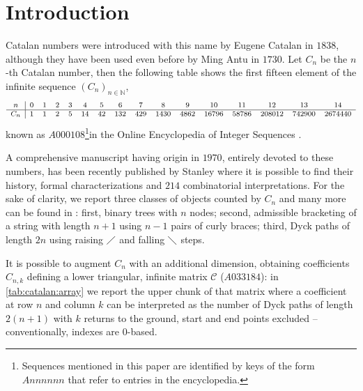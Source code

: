 
\section{Introduction}

\noindent Catalan numbers were introduced with this name by
Eugene Catalan in $1838$, although they have been used even before by Ming Antu
in $1730$. Let $C_{n}$ be the $n$-th Catalan number, then the following
table shows the first fifteen element of the infinite sequence
$\left(C_{n}\right)_{n\in\mathbb{N}}$,
\begin{displaymath}
    \footnotesize
    \begin{array}{c|ccccccccccccccc}
        n & 0 & 1 & 2 & 3 & 4 & 5 & 6 & 7 & 8 & 9 & 10 & 11 & 12 & 13 & 14 \\
        \hline
        C_{n} & 1 & 1 & 2 & 5 & 14 & 42 & 132 & 429 & 1430 & 4862 & 16796 & 58786 & 208012 & 742900 & 2674440
    \end{array}
\end{displaymath} 
known as $A000108$\footnote{Sequences mentioned in this paper are
identified by keys of the form $Annnnnn$ that refer to entries in the
encyclopedia.}in the Online Encyclopedia of Integer Sequences \cite{sloane:oeis}.

A comprehensive manuscript having origin in $1970$, entirely devoted to these
numbers, has been recently published by Stanley \cite{stanley:2015} where it is
possible to find their history, formal characterizations and $214$
combinatorial interpretations.  For the sake of clarity, we report three
classes of objects counted by $C_{n}$ and many more can be found in
\cite{ConcreteMath}: first, binary trees with $n$ nodes; second, admissible
bracketing of a string with length $n+1$ using $n-1$ pairs of curly braces;
third, Dyck paths of length $2n$ using raising $\diagup$ and falling
$\diagdown$ steps.

It is possible to augment $C_{n}$ with an additional dimension, obtaining
coefficients $C_{n,k}$ defining a lower triangular, infinite matrix
$\mathcal{C}$ ($A033184$): in \autoref{tab:catalan:array} we report the upper
chunk of that matrix where a coefficient at row $n$ and column $k$ can be
interpreted as the number of Dyck paths of length $2(n+1)$ with $k$ returns to
the ground, start and end points excluded -- conventionally, indexes are
$0$-based.




